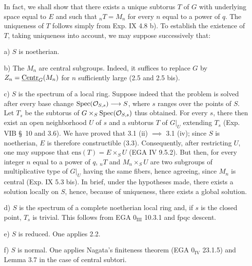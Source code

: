 In fact, we shall show that there exists a unique subtorus $T$ of $G$ with underlying space equal to $E$ and such that ${}_nT=M_n$ for every $n$ equal to a power of $q$. The uniqueness of $T$ follows simply from Exp. IX 4.8 b). To establish the existence of $T$, taking uniqueness into account, we may suppose successively that:

\noindent a) $S$ is noetherian.

\noindent b) The $M_n$ are central subgroups. Indeed, it suffices to replace $G$ by $Z_n=\underline{\mathrm{Centr}}_G(M_n)$ for $n$ sufficiently large (2.5 and 2.5 bis).

\noindent c) $S$ is the spectrum of a local ring. Suppose indeed that the problem is solved after every base change $\operatorname{Spec}(\mathcal{O}_{S,s})\longrightarrow S$, where $s$ ranges over the points of $S$. Let $T_s$ be the subtorus of $G\times_S\operatorname{Spec}(\mathcal{O}_{S,s})$ thus obtained. For every $s$, there then exist an open neighborhood $U$ of $s$ and a subtorus $T$ of $G|_U$ extending $T_s$ (Exp. VIB \S~10 and 3.6). We have proved that 3.1 (ii) $\implies$ 3.1 (iv); since $S$ is noetherian, $E$ is therefore constructible (3.3). Consequently, after restricting $U$, one may suppose that $\mathrm{ens}(T)=E\times_S U$ (EGA IV 9.5.2). But then, for every integer $n$ equal to a power of $q$, ${}_nT$ and $M_n\times_S U$ are two subgroups of multiplicative type of $G|_U$ having the same fibers, hence agreeing, since $M_n$ is central (Exp. IX 5.3 bis). In brief, under the hypotheses made, there exists a solution locally on $S$, hence, because of uniqueness, there exists a global solution.

\noindent d) $S$ is the spectrum of a complete noetherian local ring and, if $s$ is the closed point, $T_s$ is trivial. This follows from EGA $0_{\mathrm{III}}$ 10.3.1 and fpqc descent.

\noindent e) $S$ is reduced. One applies 2.2.

\noindent f) $S$ is normal. One applies Nagata's finiteness theorem (EGA $0_{\mathrm{IV}}$ 23.1.5) and Lemma 3.7 in the case of central subtori.

